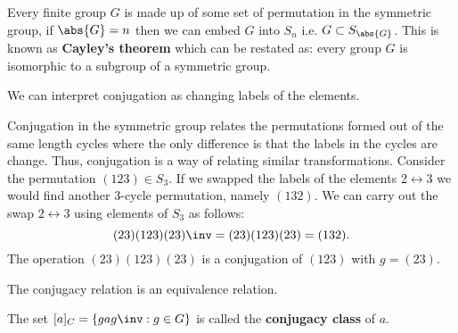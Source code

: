 \documentclass[12pt, a4paper]{article}
\begin{document}
\begin{mdremark}
    Every finite group \(G\) is made up of some set of permutation in the symmetric group, if \(\abs{G}=n\) then we can embed \(G\) into \(S_n\) i.e. \(G \subset S_{\abs{G}}\). This is known as \textbf{Cayley's theorem} which can be restated as: every group \(G\) is isomorphic to a subgroup of a symmetric group.
\end{mdremark}

\begin{mdnote}
    We can interpret conjugation as changing labels of the elements.
\end{mdnote}

\begin{example}
    Conjugation in the symmetric group relates the permutations formed out of the same length cycles where the only difference is that the labels in the cycles are change. Thus, conjugation is a way of relating similar transformations. Consider the permutation \((123) \in S_3\). If we swapped the labels of the elements \(2 \leftrightarrow 3\)  we would find another \(3\)-cycle permutation, namely \((132)\). We can carry out the swap \(2 \leftrightarrow 3\) using elements of \(S_3\) as follows:
    \[
        (23)(123)(23)\inv=(23)(123)(23)=(132).
    \]
    The operation \((23)(123)(23)\) is a conjugation of \((123)\) with \(g=(23)\).
\end{example}

\begin{theorem}
    The conjugacy relation is an equivalence relation.
\end{theorem}


\begin{definition}
    The set \([a]_C = \{gag\inv : g\in G\}\) is called the \textbf{conjugacy class} of \(a\).
\end{definition}
\end{document}

